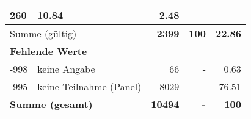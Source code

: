 \begin{longtable}{lXrrr}
       \num{260} &
       \num[round-mode=places,round-precision=2]{10.84} &
         \num[round-mode=places,round-precision=2]{2.48} \\
     \midrule
     \multicolumn{2}{l}{Summe (gültig)} &
       \textbf{\num{2399}} &
     \textbf{\num{100}} &
       \textbf{\num[round-mode=places,round-precision=2]{22.86}} \\
     \multicolumn{5}{l}{\textbf{Fehlende Werte}}\\
       -998 &
       keine Angabe &
         \num{66} &
        - &
         \num[round-mode=places,round-precision=2]{0.63} \\
       -995 &
       keine Teilnahme (Panel) &
         \num{8029} &
        - &
         \num[round-mode=places,round-precision=2]{76.51} \\
     \midrule
     \multicolumn{2}{l}{\textbf{Summe (gesamt)}} &
          \textbf{\num{10494}} &
        \textbf{-} &
        \textbf{\num{100}} \\
     \bottomrule
     \end{longtable}
     
